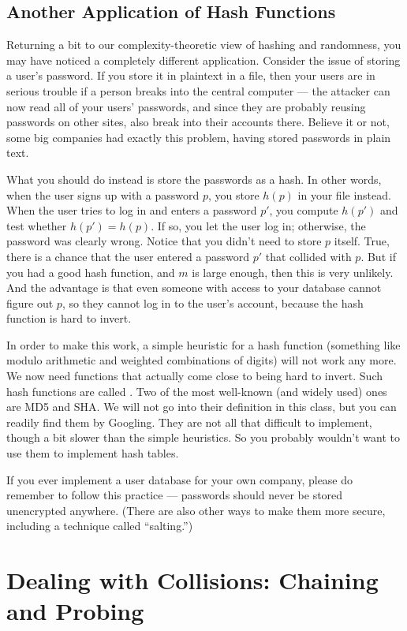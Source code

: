 \subsection{Another Application of Hash Functions}
Returning a bit to our complexity-theoretic view of hashing and
randomness, you may have noticed a completely different application.
Consider the issue of storing a user's password. 
If you store it in plaintext in a file, then your users are in serious
trouble if a person breaks into the central computer --- the attacker
can now read all of your users' passwords, and since they are probably
reusing passwords on other sites, also break into their accounts there. 
Believe it or not, some big companies had exactly this problem, having
stored passwords in plain text.

What you should do instead is store the passwords as a hash. In other
words, when the user signs up with a password $p$, you store $h(p)$ in
your file instead. 
When the user tries to log in and enters a password $p'$, you compute
$h(p')$ and test whether $h(p') = h(p)$. If so, you let the user log
in; otherwise, the password was clearly wrong. Notice that you didn't
need to store $p$ itself.
True, there is a chance that the user entered a password $p'$ that
collided with $p$. But if you had a good hash function, and $m$ is
large enough, then this is very unlikely.
And the advantage is that even someone with access to your database
cannot figure out $p$, so they cannot log in to the user's account,
because the hash function is hard to invert.

In order to make this work, a simple heuristic for a hash function
(something like modulo arithmetic and weighted combinations of digits)
will not work any more. We now need functions that actually come close
to being hard to invert. Such hash functions are called
.
Two of the most well-known (and widely used) ones are MD5 and SHA.
We will not go into their definition in this class, but you can
readily find them by Googling. They are not all that difficult to
implement, though a bit slower than the simple heuristics. So you
probably wouldn't want to use them to implement hash tables.

If you ever implement a user database for your own company, please do
remember to follow this practice --- passwords should never be stored
unencrypted anywhere. (There are also other ways to make them more
secure, including a technique called ``salting.'')

\section{Dealing with Collisions: Chaining and Probing}
\label{sec:resolution}


